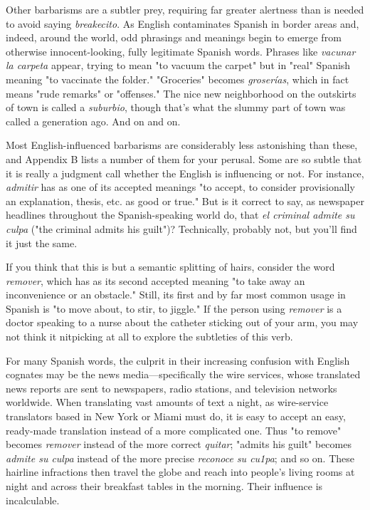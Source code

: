 Other barbarisms are a subtler prey, requiring far greater alertness than is needed to avoid saying \emph{breakecito}. As English contaminates Spanish in border areas and, indeed, around the world, odd phrasings and meanings begin to emerge from otherwise innocent-looking,
fully legitimate Spanish words. Phrases like \emph{vacunar la carpeta} appear,
trying to mean "to vacuum the carpet" but in "real" Spanish meaning
"to vaccinate the folder." "Groceries" becomes \emph{groserías}, which in
fact means "rude remarks" or "offenses." The nice new neighborhood
on the outskirts of town is called a \emph{suburbio}, though that's what the
slummy part of town was called a generation ago. And on and on.

Most English-influenced barbarisms are considerably less astonishing than these, and Appendix B lists a number of them for your
perusal. Some are so subtle that it is really a judgment call whether
the English is influencing or not. For instance, \emph{admitir} has as one of
its accepted meanings "to accept, to consider provisionally an explanation, thesis, etc. as good or true." But is it correct to say, as newspaper
headlines throughout the Spanish-speaking world do, that \emph{el criminal
admite su culpa} ("the criminal admits his guilt")? Technically, probably not, but you'll find it just the same.

If you think that this is but a semantic splitting of hairs, consider the word \emph{remover}, which has as its second accepted meaning "to
take away an inconvenience or an obstacle." Still, its first and by far
most common usage in Spanish is "to move about, to stir, to jiggle."
If the person using \emph{remover} is a doctor speaking to a nurse about the
catheter sticking out of your arm, you may not think it nitpicking at
all to explore the subtleties of this verb.

For many Spanish words, the culprit in their increasing confusion with English cognates may be the news media---specifically the
wire services, whose translated news reports are sent to newspapers,
radio stations, and television networks worldwide. When translating
vast amounts of text a night, as wire-service translators based in New
York or Miami must do, it is easy to accept an easy, ready-made translation instead of a more complicated one. Thus "to remove" becomes
\emph{remover} instead of the more correct \emph{quitar}; "admits his guilt" becomes \emph{admite su culpa} instead of the more precise \emph{reconoce su cu1pa};
and so on. These hairline infractions then travel the globe and reach
into people's living rooms at night and across their breakfast tables in
the morning. Their influence is incalculable.

